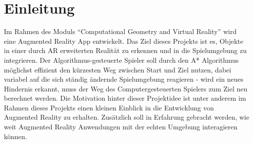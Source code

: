 \chapter{Einleitung}
Im Rahmen des Moduls “Computational Geometry and Virtual Reality” wird eine Augmented Reality App entwickelt. Das Ziel dieses Projekts ist es, Objekte in einer durch AR erweiterten Realit\"at zu erkennen und in die Spielumgebung zu integrieren. Der Algorithmus-gesteuerte Spieler soll durch den A* Algorithmus m\"oglichst effizient den k\"urzesten Weg zwischen Start und Ziel nutzen, dabei variabel auf die sich st\"andig \"andernde Spielumgebung reagieren - wird ein neues Hindernis erkannt, muss der Weg des Computergesteuerten Spielers zum Ziel neu berechnet werden. 
Die Motivation hinter dieser Projektidee ist unter anderem im Rahmen dieses Projekts einen kleinen Einblick in die Entwicklung von Augmented Reality zu erhalten. Zusätzlich soll in Erfahrung gebracht werden, wie weit Augmented Reality Anwendungen mit der echten Umgebung interagieren können.
